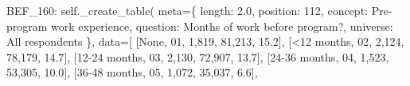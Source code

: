 \documentclass[
  11pt,
  a4paper,
]{article}
\newenvironment{Shaded}{\begin{snugshade}}{\end{snugshade}}
\newcommand{\NormalTok}[1]{\textcolor[rgb]{0.00,0.23,0.31}{#1}}
\newcommand{\OperatorTok}[1]{\textcolor[rgb]{0.37,0.37,0.37}{#1}}
\newcommand{\StringTok}[1]{\textcolor[rgb]{0.13,0.47,0.30}{#1}}
\newcommand{\VariableTok}[1]{\textcolor[rgb]{0.07,0.07,0.07}{#1}}
\begin{document}
\begin{Shaded}
\begin{Highlighting}[]
    \StringTok{\textquotesingle{}BEF\_160\textquotesingle{}}\NormalTok{: }\VariableTok{self}\NormalTok{.\_create\_table(}
\NormalTok{        meta}\OperatorTok{=}\NormalTok{\{}
            \StringTok{\textquotesingle{}length\textquotesingle{}}\NormalTok{: }\StringTok{\textquotesingle{}2.0\textquotesingle{}}\NormalTok{, }\StringTok{\textquotesingle{}position\textquotesingle{}}\NormalTok{: }\StringTok{\textquotesingle{}112\textquotesingle{}}\NormalTok{,}
            \StringTok{\textquotesingle{}concept\textquotesingle{}}\NormalTok{: }\StringTok{\textquotesingle{}Pre{-}program work experience\textquotesingle{}}\NormalTok{,}
            \StringTok{\textquotesingle{}question\textquotesingle{}}\NormalTok{: }\StringTok{\textquotesingle{}Months of work before program?\textquotesingle{}}\NormalTok{,}
            \StringTok{\textquotesingle{}universe\textquotesingle{}}\NormalTok{: }\StringTok{\textquotesingle{}All respondents\textquotesingle{}}
\NormalTok{        \},}
\NormalTok{        data}\OperatorTok{=}\NormalTok{[}
\NormalTok{            [}\StringTok{\textquotesingle{}None\textquotesingle{}}\NormalTok{, }\StringTok{\textquotesingle{}01\textquotesingle{}}\NormalTok{, }\StringTok{\textquotesingle{}1,819\textquotesingle{}}\NormalTok{, }\StringTok{\textquotesingle{}81,213\textquotesingle{}}\NormalTok{, }\StringTok{\textquotesingle{}15.2\textquotesingle{}}\NormalTok{],}
\NormalTok{            [}\StringTok{\textquotesingle{}\textless{}12 months\textquotesingle{}}\NormalTok{, }\StringTok{\textquotesingle{}02\textquotesingle{}}\NormalTok{, }\StringTok{\textquotesingle{}2,124\textquotesingle{}}\NormalTok{, }\StringTok{\textquotesingle{}78,179\textquotesingle{}}\NormalTok{, }\StringTok{\textquotesingle{}14.7\textquotesingle{}}\NormalTok{],}
\NormalTok{            [}\StringTok{\textquotesingle{}12{-}24 months\textquotesingle{}}\NormalTok{, }\StringTok{\textquotesingle{}03\textquotesingle{}}\NormalTok{, }\StringTok{\textquotesingle{}2,130\textquotesingle{}}\NormalTok{, }\StringTok{\textquotesingle{}72,907\textquotesingle{}}\NormalTok{, }\StringTok{\textquotesingle{}13.7\textquotesingle{}}\NormalTok{],}
\NormalTok{            [}\StringTok{\textquotesingle{}24{-}36 months\textquotesingle{}}\NormalTok{, }\StringTok{\textquotesingle{}04\textquotesingle{}}\NormalTok{, }\StringTok{\textquotesingle{}1,523\textquotesingle{}}\NormalTok{, }\StringTok{\textquotesingle{}53,305\textquotesingle{}}\NormalTok{, }\StringTok{\textquotesingle{}10.0\textquotesingle{}}\NormalTok{],}
\NormalTok{            [}\StringTok{\textquotesingle{}36{-}48 months\textquotesingle{}}\NormalTok{, }\StringTok{\textquotesingle{}05\textquotesingle{}}\NormalTok{, }\StringTok{\textquotesingle{}1,072\textquotesingle{}}\NormalTok{, }\StringTok{\textquotesingle{}35,037\textquotesingle{}}\NormalTok{, }\StringTok{\textquotesingle{}6.6\textquotesingle{}}\NormalTok{],}

\end{Highlighting}
\end{Shaded}
\end{document}
